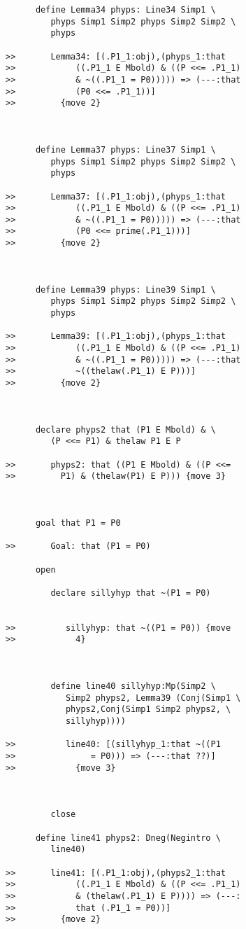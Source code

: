 \documentclass[12pt]{article}
\begin{document}
\begin{verbatim}
      define Lemma34 phyps: Line34 Simp1 \
         phyps Simp1 Simp2 phyps Simp2 Simp2 \
         phyps

>>       Lemma34: [(.P1_1:obj),(phyps_1:that
>>            ((.P1_1 E Mbold) & ((P <<= .P1_1)
>>            & ~((.P1_1 = P0))))) => (---:that
>>            (P0 <<= .P1_1))]
>>         {move 2}



      define Lemma37 phyps: Line37 Simp1 \
         phyps Simp1 Simp2 phyps Simp2 Simp2 \
         phyps

>>       Lemma37: [(.P1_1:obj),(phyps_1:that
>>            ((.P1_1 E Mbold) & ((P <<= .P1_1)
>>            & ~((.P1_1 = P0))))) => (---:that
>>            (P0 <<= prime(.P1_1)))]
>>         {move 2}



      define Lemma39 phyps: Line39 Simp1 \
         phyps Simp1 Simp2 phyps Simp2 Simp2 \
         phyps

>>       Lemma39: [(.P1_1:obj),(phyps_1:that
>>            ((.P1_1 E Mbold) & ((P <<= .P1_1)
>>            & ~((.P1_1 = P0))))) => (---:that
>>            ~((thelaw(.P1_1) E P)))]
>>         {move 2}



      declare phyps2 that (P1 E Mbold) & \
         (P <<= P1) & thelaw P1 E P

>>       phyps2: that ((P1 E Mbold) & ((P <<=
>>         P1) & (thelaw(P1) E P))) {move 3}



      goal that P1 = P0

>>       Goal: that (P1 = P0)

      open

         declare sillyhyp that ~(P1 = P0)


>>          sillyhyp: that ~((P1 = P0)) {move
>>            4}



         define line40 sillyhyp:Mp(Simp2 \
            Simp2 phyps2, Lemma39 (Conj(Simp1 \
            phyps2,Conj(Simp1 Simp2 phyps2, \
            sillyhyp))))

>>          line40: [(sillyhyp_1:that ~((P1
>>               = P0))) => (---:that ??)]
>>            {move 3}



         close

      define line41 phyps2: Dneg(Negintro \
         line40)

>>       line41: [(.P1_1:obj),(phyps2_1:that
>>            ((.P1_1 E Mbold) & ((P <<= .P1_1)
>>            & (thelaw(.P1_1) E P)))) => (---:
>>            that (.P1_1 = P0))]
>>         {move 2}




\end{verbatim}
\end{document}
